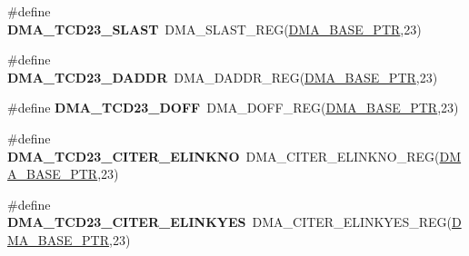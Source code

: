 \begin{DoxyCompactItemize}
\item 
\hypertarget{group___d_m_a___register___accessor___macros_ga634138e3925c580bd53437a5e5b3bbb9}{}\#define {\bfseries D\+M\+A\+\_\+\+T\+C\+D23\+\_\+\+S\+L\+A\+S\+T}~D\+M\+A\+\_\+\+S\+L\+A\+S\+T\+\_\+\+R\+E\+G(\hyperlink{group___d_m_a___peripheral_ga6997fbc1b1973e9f27170217a3bd6f22}{D\+M\+A\+\_\+\+B\+A\+S\+E\+\_\+\+P\+T\+R},23)\label{group___d_m_a___register___accessor___macros_ga634138e3925c580bd53437a5e5b3bbb9}

\item 
\hypertarget{group___d_m_a___register___accessor___macros_ga39b0f47d29c938b36e52077e578875b8}{}\#define {\bfseries D\+M\+A\+\_\+\+T\+C\+D23\+\_\+\+D\+A\+D\+D\+R}~D\+M\+A\+\_\+\+D\+A\+D\+D\+R\+\_\+\+R\+E\+G(\hyperlink{group___d_m_a___peripheral_ga6997fbc1b1973e9f27170217a3bd6f22}{D\+M\+A\+\_\+\+B\+A\+S\+E\+\_\+\+P\+T\+R},23)\label{group___d_m_a___register___accessor___macros_ga39b0f47d29c938b36e52077e578875b8}

\item 
\hypertarget{group___d_m_a___register___accessor___macros_ga6383b4ce4d11f9395ab42c31db2b5d20}{}\#define {\bfseries D\+M\+A\+\_\+\+T\+C\+D23\+\_\+\+D\+O\+F\+F}~D\+M\+A\+\_\+\+D\+O\+F\+F\+\_\+\+R\+E\+G(\hyperlink{group___d_m_a___peripheral_ga6997fbc1b1973e9f27170217a3bd6f22}{D\+M\+A\+\_\+\+B\+A\+S\+E\+\_\+\+P\+T\+R},23)\label{group___d_m_a___register___accessor___macros_ga6383b4ce4d11f9395ab42c31db2b5d20}

\item 
\hypertarget{group___d_m_a___register___accessor___macros_gacfa4df9d7915e61673666e0140b48d59}{}\#define {\bfseries D\+M\+A\+\_\+\+T\+C\+D23\+\_\+\+C\+I\+T\+E\+R\+\_\+\+E\+L\+I\+N\+K\+N\+O}~D\+M\+A\+\_\+\+C\+I\+T\+E\+R\+\_\+\+E\+L\+I\+N\+K\+N\+O\+\_\+\+R\+E\+G(\hyperlink{group___d_m_a___peripheral_ga6997fbc1b1973e9f27170217a3bd6f22}{D\+M\+A\+\_\+\+B\+A\+S\+E\+\_\+\+P\+T\+R},23)\label{group___d_m_a___register___accessor___macros_gacfa4df9d7915e61673666e0140b48d59}

\item 
\hypertarget{group___d_m_a___register___accessor___macros_gaa82e5c81f17321839081864ef45d66ee}{}\#define {\bfseries D\+M\+A\+\_\+\+T\+C\+D23\+\_\+\+C\+I\+T\+E\+R\+\_\+\+E\+L\+I\+N\+K\+Y\+E\+S}~D\+M\+A\+\_\+\+C\+I\+T\+E\+R\+\_\+\+E\+L\+I\+N\+K\+Y\+E\+S\+\_\+\+R\+E\+G(\hyperlink{group___d_m_a___peripheral_ga6997fbc1b1973e9f27170217a3bd6f22}{D\+M\+A\+\_\+\+B\+A\+S\+E\+\_\+\+P\+T\+R},23)\label{group___d_m_a___register___accessor___macros_gaa82e5c81f17321839081864ef45d66ee}


\end{DoxyCompactItemize}

